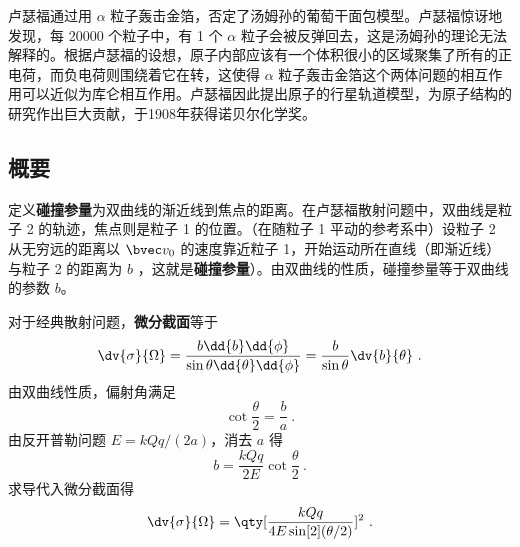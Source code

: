 
卢瑟福通过用 $\alpha$ 粒子轰击金箔，否定了汤姆孙的葡萄干面包模型。卢瑟福惊讶地发现，每 20000 个粒子中，有 1 个 $\alpha$ 粒子会被反弹回去，这是汤姆孙的理论无法解释的。根据卢瑟福的设想，原子内部应该有一个体积很小的区域聚集了所有的正电荷，而负电荷则围绕着它在转，这使得 $\alpha$ 粒子轰击金箔这个两体问题的相互作用可以近似为库仑相互作用。卢瑟福因此提出原子的行星轨道模型，为原子结构的研究作出巨大贡献，于1908年获得诺贝尔化学奖。
\subsection{概要}
定义\textbf{碰撞参量}为双曲线的渐近线到焦点的距离。在卢瑟福散射问题中，双曲线是粒子 2 的轨迹，焦点则是粒子 1 的位置。（在随粒子 1 平动的参考系中）设粒子 2 从无穷远的距离以 $\bvec v_0$ 的速度靠近粒子 1，开始运动所在直线（即渐近线）与粒子 2 的距离为 $b$ ，这就是\textbf{碰撞参量}）。由双曲线的性质，碰撞参量等于双曲线的参数 $b$。

对于经典散射问题，\textbf{微分截面}等于
\begin{equation}
\dv{\sigma}{\Omega} = \frac{b \dd{b}\dd{\phi} }{\sin \theta \dd{\theta} \dd{\phi} } = \frac{b}{\sin \theta }\dv{b}{\theta}~.
\end{equation}
由双曲线性质，偏射角满足
\begin{equation}
\cot{\frac{\theta }{2}}= \frac{b}{a}~.
\end{equation}
由反开普勒问题  $E = kQq/(2a)$，消去 $a$ 得
\begin{equation}
b = \frac{kQq}{2E}\cot {\frac{\theta }{2}}~.
\end{equation}
求导代入微分截面得
\begin{equation}\label{eq_RuthSc_1}
\dv{\sigma}{\Omega} = \qty[ \frac{kQq}{4E \sin[2](\theta /2)} ]^2~.
\end{equation}

